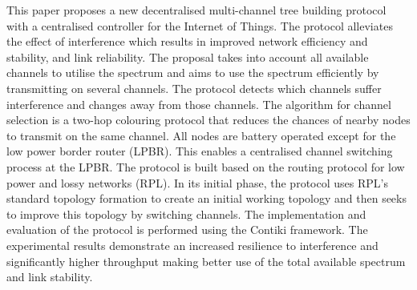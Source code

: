 This paper proposes a new decentralised multi-channel tree building protocol with a centralised controller for the Internet of Things. The protocol alleviates the effect of interference which results in improved network efficiency and stability, and link reliability. The proposal takes into account all available channels to utilise the spectrum and aims to use the spectrum efficiently by transmitting on several channels. The protocol detects which channels suffer interference and changes away from those channels. The algorithm for channel selection is a two-hop colouring protocol that reduces the chances of nearby nodes to transmit on the same channel. All nodes are battery operated except for the low power border router (LPBR). This enables a centralised channel switching process at the LPBR. The protocol is built based on the routing protocol for low power and lossy networks (RPL). In its initial phase, the protocol uses RPL's standard topology formation to create an initial working topology and then seeks to improve this topology by switching channels. The implementation and evaluation of the protocol is performed using the Contiki framework. The experimental results demonstrate an increased resilience to interference and significantly higher throughput making better use of the total available spectrum and link stability.